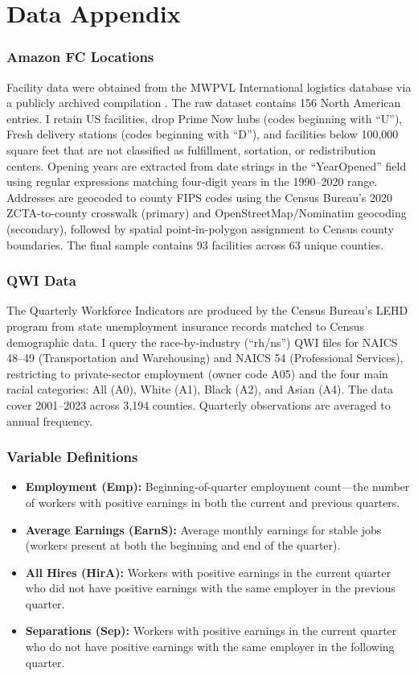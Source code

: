 \documentclass[12pt]{article}
\begin{document}
\newpage
\appendix

\section{Data Appendix}

\subsubsection*{Amazon FC Locations} Facility data were obtained from the MWPVL International logistics database via a publicly archived compilation \citep{MWPVL2016}. The raw dataset contains 156 North American entries. I retain US facilities, drop Prime Now hubs (codes beginning with ``U''), Fresh delivery stations (codes beginning with ``D''), and facilities below 100,000 square feet that are not classified as fulfillment, sortation, or redistribution centers. Opening years are extracted from date strings in the ``YearOpened'' field using regular expressions matching four-digit years in the 1990--2020 range. Addresses are geocoded to county FIPS codes using the Census Bureau's 2020 ZCTA-to-county crosswalk (primary) and OpenStreetMap/Nominatim geocoding (secondary), followed by spatial point-in-polygon assignment to Census county boundaries. The final sample contains 93 facilities across 63 unique counties.

\subsubsection*{QWI Data} The Quarterly Workforce Indicators are produced by the Census Bureau's LEHD program from state unemployment insurance records matched to Census demographic data. I query the race-by-industry (``rh/ns'') QWI files for NAICS 48--49 (Transportation and Warehousing) and NAICS 54 (Professional Services), restricting to private-sector employment (owner code A05) and the four main racial categories: All (A0), White (A1), Black (A2), and Asian (A4). The data cover 2001--2023 across 3,194 counties. Quarterly observations are averaged to annual frequency.

\subsubsection*{Variable Definitions}
\begin{itemize}
  \item \textbf{Employment (Emp):} Beginning-of-quarter employment count---the number of workers with positive earnings in both the current and previous quarters.
  \item \textbf{Average Earnings (EarnS):} Average monthly earnings for stable jobs (workers present at both the beginning and end of the quarter).
  \item \textbf{All Hires (HirA):} Workers with positive earnings in the current quarter who did not have positive earnings with the same employer in the previous quarter.
  \item \textbf{Separations (Sep):} Workers with positive earnings in the current quarter who do not have positive earnings with the same employer in the following quarter.
\end{itemize}
\end{document}
